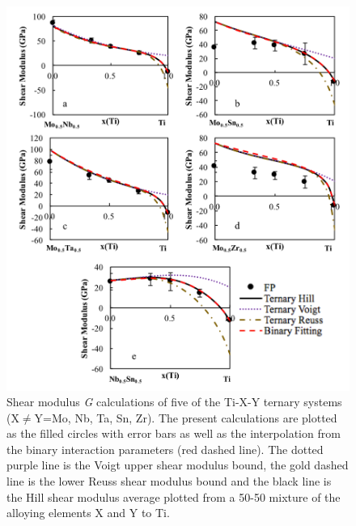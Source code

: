 \pagebreak
\begin{figure}[H]
	\centering
	\includegraphics[width=\textwidth]{Chapter-6/Figures/tixyshear1.png}
	\caption{Shear modulus \textit{G} calculations of five of the Ti-X-Y ternary systems (X$\neq$Y=Mo, Nb, Ta, Sn, Zr). The present calculations are plotted as the filled circles with error bars as well as the interpolation from the binary interaction parameters (red dashed line). The dotted purple line is the Voigt upper shear modulus bound, the gold dashed line is the lower Reuss shear modulus bound and the black line is the Hill shear modulus average plotted from a 50-50 mixture of the alloying elements X and Y to Ti.}
	\label{Ch6-figure:tixyshear1}
\end{figure}

